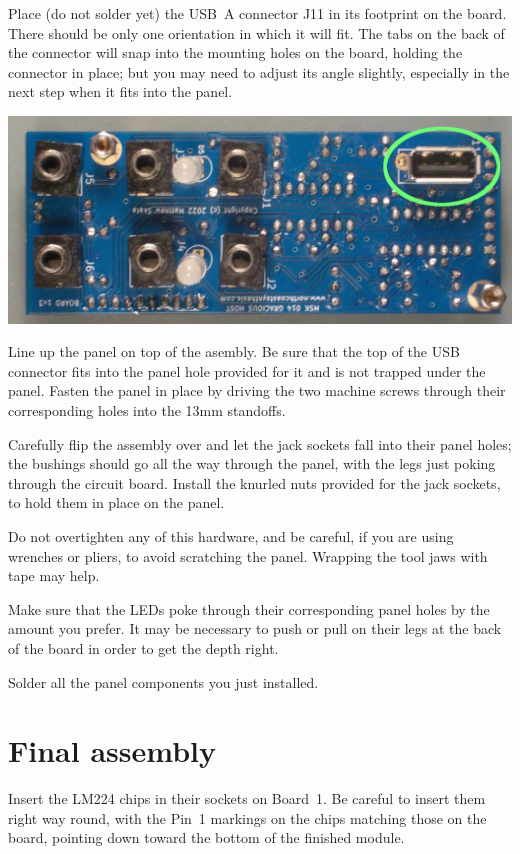 Place (do not solder yet) the USB~A connector J11 in its footprint on the
board.  There should be only one orientation in which it will fit.  The tabs
on the back of the connector will snap into the mounting holes on the board,
holding the connector in place; but you may need to adjust its angle
slightly, especially in the next step when it fits into the panel.

\nopagebreak
\noindent\includegraphics[width=\linewidth]{usb-a.jpg}

Line up the panel on top of the asembly.  Be sure that the top of the USB
connector fits into the panel hole provided for it and is not trapped under
the panel.  Fasten the panel in place by driving
the two machine screws through their corresponding holes into the 13mm
standoffs.

Carefully flip the assembly over and let the jack sockets fall into their
panel holes; the bushings should go all the way through the panel, with the
legs just poking through the circuit board.  Install the knurled nuts
provided for the jack sockets, to hold them in place on the panel.

Do not overtighten any of this hardware, and be careful, if you are
using wrenches or pliers, to avoid scratching the panel.  Wrapping the tool
jaws with tape may help.

Make sure that the LEDs poke through their corresponding panel holes by the
amount you prefer.  It may be necessary to push or pull on their legs at the
back of the board in order to get the depth right.

Solder all the panel components you just installed.

\section{Final assembly}

Insert the LM224 chips in their sockets on Board~1.  Be careful to insert
them right way round, with the Pin~1 markings on the chips matching those on
the board, pointing down toward the bottom of the finished module.

